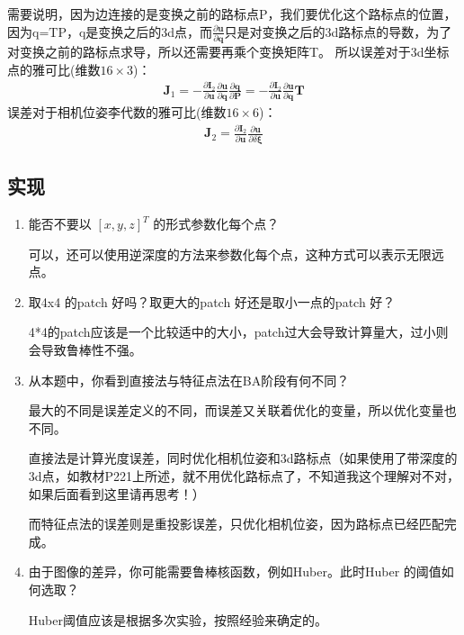 \documentclass[40pt,a4paper，UTF8]{ctexart}
\numberwithin{equation}{section}
\begin{document}
\begin{enumerate}
需要说明，因为边连接的是变换之前的路标点P，我们要优化这个路标点的位置，因为q=TP，q是变换之后的3d点，而$\frac{\partial \bm u}{\partial \bm q}$只是对变换之后的3d路标点的导数，为了对变换之前的路标点求导，所以还需要再乘个变换矩阵T。
所以误差对于3d坐标点的雅可比(维数$16\times 3$)：
\begin{align}
\bm J_1=-\frac{\partial \bm I_2}{\partial \bm u}\frac{\partial \bm u}{\partial \bm q}  \frac{\partial \bm q}{\partial \bm P} =-\frac{\partial \bm I_2}{\partial \bm u}\frac{\partial \bm u}{\partial \bm q} \bm T
\end{align}
误差对于相机位姿李代数的雅可比(维数$16\times 6$)：
\begin{align}
\bm J_2 = \frac{\partial \bm I_2}{\partial \bm u}\frac{\partial \bm u}{\partial  \delta \bm \xi} 
\end{align}
\end{enumerate}

\subsection{实现}
\begin{enumerate}
\item 能否不要以 $[x, y, z]^T$ 的形式参数化每个点？

可以，还可以使用逆深度的方法来参数化每个点，这种方式可以表示无限远点。

\item 取4x4 的patch 好吗？取更⼤的patch 好还是取⼩⼀点的patch 好？

4*4的patch应该是一个比较适中的大小，patch过大会导致计算量大，过小则会导致鲁棒性不强。

\item 从本题中，你看到直接法与特征点法在BA阶段有何不同？

最大的不同是误差定义的不同，而误差又关联着优化的变量，所以优化变量也不同。

直接法是计算光度误差，同时优化相机位姿和3d路标点（如果使用了带深度的3d点，如教材P221上所述，就不用优化路标点了，不知道我这个理解对不对，如果后面看到这里请再思考！）

而特征点法的误差则是重投影误差，只优化相机位姿，因为路标点已经匹配完成。

\item 由于图像的差异，你可能需要鲁棒核函数，例如Huber。此时Huber 的阈值如何选取？

Huber阈值应该是根据多次实验，按照经验来确定的。
\end{enumerate}
\end{document}
